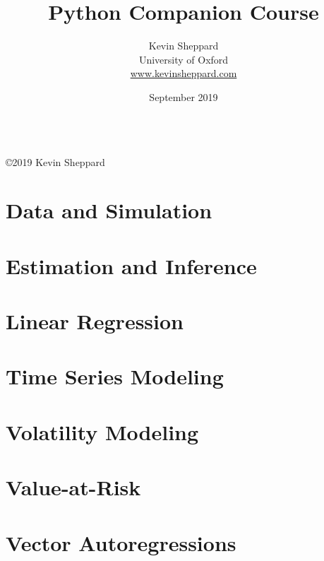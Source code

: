 \documentclass[11pt, a4paper]{book}
\title{Python Companion Course}
\author{Kevin Sheppard\\
University of Oxford\\
\href{https://www.kevinsheppard.com}{www.kevinsheppard.com}}
\date{September 2019}
\begin{document}
\maketitle
\begin{tabular}{c}
\tabularnewline
\end{tabular}

\thispagestyle{empty}

\vfill{}

\begin{center}
\textsf{\footnotesize{}©}2019 Kevin Sheppard
\par\end{center}
\thispagestyle{empty}\tableofcontents{}\thispagestyle{empty}
\mainmatter
\chapter{Data and Simulation}



\chapter{Estimation and Inference}



\chapter{Linear Regression}



\chapter{Time Series Modeling}





\chapter{Volatility Modeling}



\chapter{Value-at-Risk}



\chapter{Vector Autoregressions}





\end{document}
